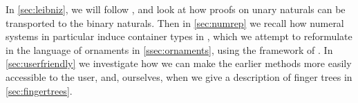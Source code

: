 In \autoref{sec:leibniz}, we will follow \cite{iri}, and look at how proofs on unary naturals can be transported to the binary naturals. Then in \autoref{sec:numrep} we recall how numeral systems in particular induce container types in \cite{calcdata}, which we attempt to reformulate in the language of ornaments in \autoref{ssec:ornaments}, using the framework of \cite{progorn}. In \autoref{sec:userfriendly} we investigate how we can make the earlier methods more easily accessible to the user, and, ourselves, when we give a description of finger trees in \autoref{sec:fingertrees}.

